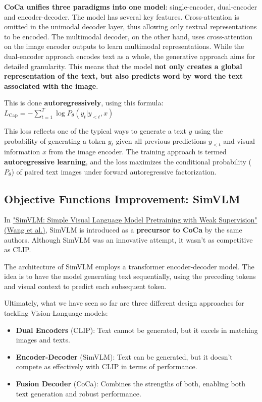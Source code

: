 \textbf{CoCa unifies three paradigms into one model}: single-encoder, dual-encoder and encoder-decoder. The model has several key features. Cross-attention is omitted in the unimodal decoder layer, thus allowing only textual representations to be encoded. The multimodal decoder, on the other hand, uses cross-attention on the image encoder outputs to learn multimodal representations. While the dual-encoder approach encodes text as a whole, the generative approach aims for detailed granularity. This means that the model \textbf{not only creates a global representation of the text, but also predicts word by word the text associated with the image}.

This is done \textbf{autoregressively}, using this formula: $L_\text{Cap} = - \sum_{t=1}^{T}\log P_{\theta}(y_t|y_{<t},x) $

This loss reflects one of the typical ways to generate a text $y$ using the probability of generating a token $y_t$ given all previous predictions $y_{<t}$ and visual information $x$ from the image encoder. The training approach is termed \textbf{autoregressive learning}, and the loss maximizes the conditional probability ($P_\theta$) of paired text images under forward autoregressive factorization.

\subsection{Objective Functions Improvement: SimVLM}


In \href{https://arxiv.org/pdf/2108.10904}{"SimVLM: Simple Visual Language Model Pretraining with Weak Supervision" (Wang et al.)}, SimVLM is introduced as a \textbf{precursor to CoCa} by the same authors. Although SimVLM was an innovative attempt, it wasn't as competitive as CLIP.

The architecture of SimVLM employs a transformer encoder-decoder model. The idea is to have the model generating text sequentially, using the preceding tokens and visual context to predict each subsequent token.

Ultimately, what we have seen so far are three different design approaches for tackling Vision-Language models:
\begin{itemize}
    \item \textbf{Dual Encoders} (CLIP): Text cannot be generated, but it excels in matching images and texts.
    \item \textbf{Encoder-Decoder} (SimVLM): Text can be generated, but it doesn't compete as effectively with CLIP in terms of performance.
    \item \textbf{Fusion Decoder} (CoCa): Combines the strengths of both, enabling both text generation and robust performance.
\end{itemize}

